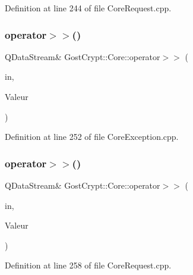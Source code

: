 Definition at line 244 of file Core\+Request.\+cpp.

\mbox{\label{namespace_gost_crypt_1_1_core_a9ef0e1421bd8045e289d3b18faf6408f}} 
\subsubsection{\texorpdfstring{operator$>$$>$()}{operator>>()}\hspace{0.1cm}{\footnotesize\ttfamily [48/56]}}
{\footnotesize\ttfamily Q\+Data\+Stream\& Gost\+Crypt\+::\+Core\+::operator$>$$>$ (\begin{DoxyParamCaption}\item[{Q\+Data\+Stream \&}]{in,  }\item[{\hyperlink{class_gost_crypt_1_1_core_1_1_incorrect_sudo_password}{Gost\+Crypt\+::\+Core\+::\+Incorrect\+Sudo\+Password} \&}]{Valeur }\end{DoxyParamCaption})}



Definition at line 252 of file Core\+Exception.\+cpp.

\mbox{\label{namespace_gost_crypt_1_1_core_a69d930dadb4047e39fcc4debbd0c2222}} 
\subsubsection{\texorpdfstring{operator$>$$>$()}{operator>>()}\hspace{0.1cm}{\footnotesize\ttfamily [49/56]}}
{\footnotesize\ttfamily Q\+Data\+Stream\& Gost\+Crypt\+::\+Core\+::operator$>$$>$ (\begin{DoxyParamCaption}\item[{Q\+Data\+Stream \&}]{in,  }\item[{\hyperlink{struct_gost_crypt_1_1_core_1_1_progress_tracking_parameters}{Progress\+Tracking\+Parameters} \&}]{Valeur }\end{DoxyParamCaption})}



Definition at line 258 of file Core\+Request.\+cpp.

